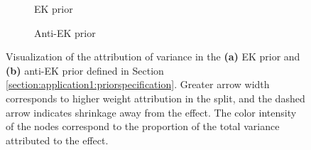 \begin{figure}[h!]
    \centering
    \begin{subfigure}[b]{0.470\textwidth}   
        \centering 
        
        \caption[]%
        {{\small EK prior}}    
        \label{figure:application1:EK}
    \end{subfigure}
    \hfill
    \begin{subfigure}[b]{0.470\textwidth}   
        \centering 
        
        \caption[]%
        {{\small Anti-EK prior}}    
        \label{figure:application1:antiEK}
    \end{subfigure}
    \caption{Visualization of the attribution of variance in the \textbf{(a)} EK prior and \textbf{(b)} anti-EK prior defined in Section \ref{section:application1:priorspecification}. Greater arrow width corresponds to higher weight attribution in the split, and the dashed arrow indicates shrinkage away from the effect. The color intensity of the nodes correspond to the proportion of the total variance attributed to the effect.}
    \label{fig:result:prior}
\end{figure}

